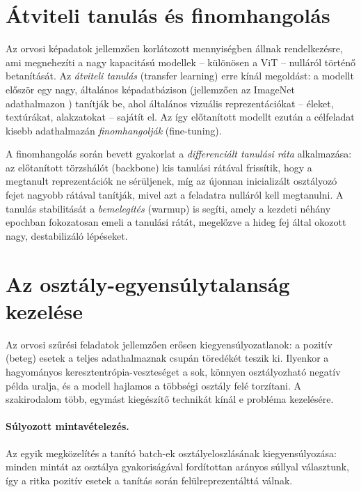\section{Átviteli tanulás és finomhangolás}

Az orvosi képadatok jellemzően korlátozott mennyiségben állnak rendelkezésre,
ami megnehezíti a nagy kapacitású modellek -- különösen a ViT -- nulláról történő
betanítását. Az \textit{átviteli tanulás} (transfer learning) erre kínál
megoldást: a modellt először egy nagy, általános képadatbázison (jellemzően az
ImageNet adathalmazon \cite{russakovsky2015imagenet}) tanítják be, ahol általános
vizuális reprezentációkat -- éleket, textúrákat, alakzatokat -- sajátít el. Az
így előtanított modellt ezután a célfeladat kisebb adathalmazán
\textit{finomhangolják} (fine-tuning).

A finomhangolás során bevett gyakorlat a \textit{differenciált tanulási ráta}
alkalmazása: az előtanított törzshálót (backbone) kis tanulási rátával frissítik,
hogy a megtanult reprezentációk ne sérüljenek, míg az újonnan inicializált
osztályozó fejet nagyobb rátával tanítják, mivel azt a feladatra nulláról kell
megtanulni. A tanulás stabilitását a \textit{bemelegítés} (warmup) is segíti,
amely a kezdeti néhány epochban fokozatosan emeli a tanulási rátát, megelőzve a
hideg fej által okozott nagy, destabilizáló lépéseket.

\section{Az osztály-egyensúlytalanság kezelése}

Az orvosi szűrési feladatok jellemzően erősen kiegyensúlyozatlanok: a pozitív
(beteg) esetek a teljes adathalmaznak csupán töredékét teszik ki. Ilyenkor a
hagyományos keresztentrópia-veszteséget a sok, könnyen osztályozható negatív
példa uralja, és a modell hajlamos a többségi osztály felé torzítani. A
szakirodalom több, egymást kiegészítő technikát kínál e probléma kezelésére.

\paragraph{Súlyozott mintavételezés.} Az egyik megközelítés a tanító batch-ek
osztályeloszlásának kiegyensúlyozása: minden mintát az osztálya gyakoriságával
fordítottan arányos súllyal választunk, így a ritka pozitív esetek a tanítás
során felülreprezentálttá válnak.

